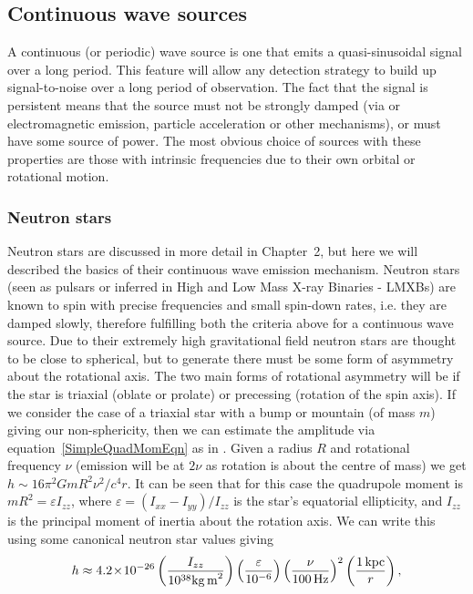 \subsection{Continuous wave sources}
A continuous (or periodic) wave source is one that emits a quasi-sinusoidal signal over a long
period. This feature will allow any detection strategy to build up signal-to-noise over a long
period of observation. The fact that the signal is persistent means that the source must not be
strongly damped (via \gw or electromagnetic emission, particle acceleration or other mechanisms),
or must have some source of power. The most obvious choice of sources with these properties are
those with intrinsic frequencies due to their own orbital or rotational motion.

\subsubsection{Neutron stars}
Neutron stars are discussed in more detail in Chapter~2, but here we will described the basics of
their continuous wave emission mechanism. Neutron stars (seen as pulsars or inferred in High and Low
Mass X-ray Binaries - LMXBs) are known to spin with precise frequencies and small spin-down rates,
i.e. they are damped slowly, therefore fulfilling both the criteria above for a continuous wave
source. Due to their extremely high gravitational field neutron stars are thought to be close to
spherical, but to generate \gws there must be some form of asymmetry about the rotational axis.
The two main forms of rotational asymmetry will be if the star is triaxial (oblate or prolate) or
precessing (rotation of the spin axis). If we consider the case of a triaxial star with a bump or
mountain (of mass $m$) giving our non-sphericity, then we can estimate the \gw amplitude via
equation~\ref{SimpleQuadMomEqn} as in \cite{Schutz:1999}. Given a radius $R$ and rotational
frequency $\nu$ (emission will be at $2\nu$ as rotation is about the centre of mass) we get $h \sim
16\pi^2GmR^2\nu^2/c^4r$. It can be seen that for this case the quadrupole moment is $mR^2 =
\varepsilon{}I_{zz}$, where $\varepsilon = (I_{xx}-I_{yy})/I_{zz}$ is the star's equatorial
ellipticity, and $I_{zz}$ is the principal moment of inertia about the rotation axis. We can write
this using some canonical neutron star values giving
\begin{equation}
h \approx 4.2\!\times\!10^{-26}\left(\frac{I_{zz}}{10^{38}{\rm
kg\,m}^2}\right)\left(\frac{\varepsilon}{10^{-6}}\right)\left(\frac{\nu}{100\,{\rm
Hz}}\right)^2\left(\frac{1\,{\rm kpc}}{r}\right),
\end{equation}
